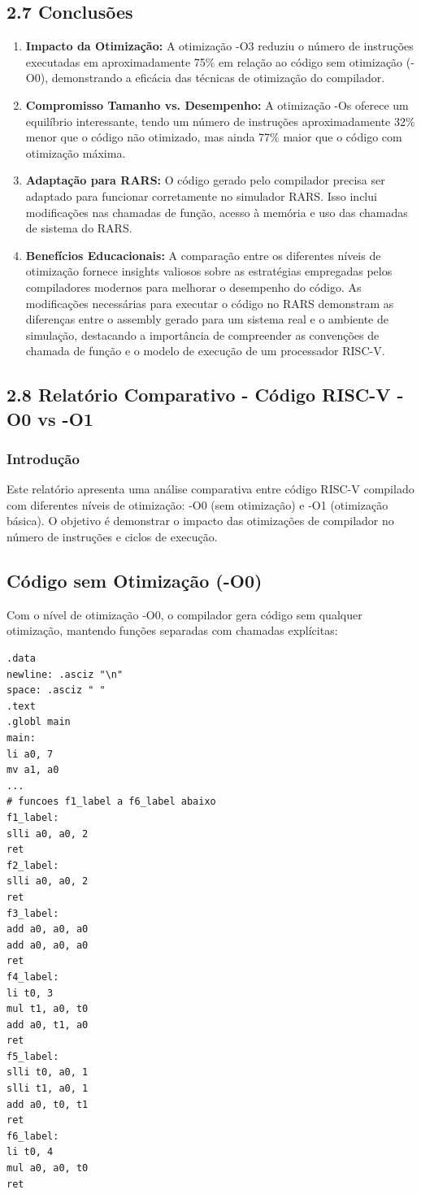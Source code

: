 \documentclass[12pt,a4paper]{article}
\begin{document}
\subsection*{2.7 Conclusões}
\begin{enumerate}
    \item \textbf{Impacto da Otimização:} A otimização -O3 reduziu o número de instruções executadas em aproximadamente 75\% em relação ao código sem otimização (-O0), demonstrando a eficácia das técnicas de otimização do compilador.
    \item \textbf{Compromisso Tamanho vs. Desempenho:} A otimização -Os oferece um equilíbrio interessante, tendo um número de instruções aproximadamente 32\% menor que o código não otimizado, mas ainda 77\% maior que o código com otimização máxima.
    \item \textbf{Adaptação para RARS:} O código gerado pelo compilador precisa ser adaptado para funcionar corretamente no simulador RARS. Isso inclui modificações nas chamadas de função, acesso à memória e uso das chamadas de sistema do RARS.
    \item \textbf{Benefícios Educacionais:} A comparação entre os diferentes níveis de otimização fornece insights valiosos sobre as estratégias empregadas pelos compiladores modernos para melhorar o desempenho do código. As modificações necessárias para executar o código no RARS demonstram as diferenças entre o assembly gerado para um sistema real e o ambiente de simulação, destacando a importância de compreender as convenções de chamada de função e o modelo de execução de um processador RISC-V.
\end{enumerate}

\subsection*{2.8 Relatório Comparativo - Código RISC-V -O0 vs -O1}
\subsubsection*{Introdução}
Este relatório apresenta uma análise comparativa entre código RISC-V compilado com diferentes níveis de otimização: -O0 (sem otimização) e -O1 (otimização básica). O objetivo é demonstrar o impacto das otimizações de compilador no número de instruções e ciclos de execução.

\subsection*{Código sem Otimização (-O0)}
Com o nível de otimização -O0, o compilador gera código sem qualquer otimização, mantendo funções separadas com chamadas explícitas:
\begin{lstlisting}[language=Assembly]
.data
newline: .asciz "\n"
space: .asciz " "
.text
.globl main
main:
li a0, 7
mv a1, a0
...
# funcoes f1_label a f6_label abaixo
f1_label:
slli a0, a0, 2
ret
f2_label:
slli a0, a0, 2
ret
f3_label:
add a0, a0, a0
add a0, a0, a0
ret
f4_label:
li t0, 3
mul t1, a0, t0
add a0, t1, a0
ret
f5_label:
slli t0, a0, 1
slli t1, a0, 1
add a0, t0, t1
ret
f6_label:
li t0, 4
mul a0, a0, t0
ret
\end{lstlisting}
\end{document}
